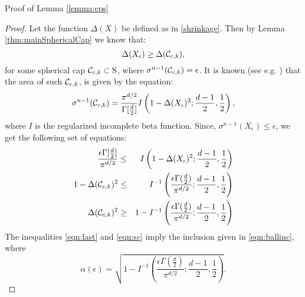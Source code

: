 \begin{subsection}{Proof of Lemma \ref{lemma:eps}}
\label{app:eps}

\begin{proof}Let the function $\Delta(X)$ be defined as in \eqref{shrinkage}. Then by Lemma \ref{thm:mainSphericalCap} we know that:
\begin{equation}\label{eqn:sc}\Delta(X_\epsilon) \geq \Delta(\mathcal{C}_{c, k}),
\end{equation}
for some spherical cap $\mathcal{C}_{c,k} \subset \text{S}$, where  $\sigma^{n-1}(\mathcal{C}_{c, k}) = \epsilon$. It is known (see e.g. \cite{sphericalCapRef}) that the area of such $\mathcal{C}_{c, k}$, is given by the equation:
\begin{equation}\sigma^{n-1}(\mathcal{C}_{c, k}) = \frac{\pi^{d/2}}{\Gamma[\frac{d}{2}]}I\left(1-\Delta(X_\epsilon)^2; \frac{d-1}{2}, \frac{1}{2}\right),
\end{equation}
where $I$ is the regularized incomplete beta function. Since, \mbox{$\sigma^{n-1}(X_\epsilon)\leq \epsilon$,} we get the following set of equations:
\begin{eqnarray}\nonumber \frac{\epsilon \Gamma[\frac{d}{2}]}{\pi^{d/2}} &\leq& I\left(1- \Delta(X_\epsilon)^2;\frac{d-1}{2}, \frac{1}{2}\right) \\
\nonumber 1- \Delta(\mathcal{C}_{c, k})^2 &\leq&  I^{-1}\left(\frac{\epsilon\Gamma(\frac{d}{2})}{\pi^{d/2}}; \frac{d-1}{2}, \frac{1}{2}\right) \\
\label{eqn:last}\Delta(\mathcal{C}_{c, k})^2 &\geq&  1- I^{-1}\left(\frac{\epsilon\Gamma(\frac{d}{2})}{\pi^{d/2}}; \frac{d-1}{2}, \frac{1}{2}\right)
\end{eqnarray}
The inequalities \eqref{eqn:last} and \eqref{eqn:sc} imply the inclusion given in \eqref{eqn:ballinc}, where \begin{equation}\label{eqn:alphaEpsilon}\alpha(\epsilon) = \sqrt{1- I^{-1}\left(\frac{\epsilon\Gamma(\frac{d}{2})}{\pi^{d/2}}; \frac{d-1}{2}, \frac{1}{2}\right)}.\end{equation}
\end{proof}
\end{subsection}


